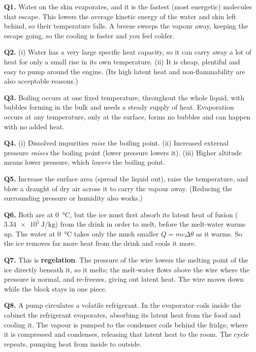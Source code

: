 \documentclass[10pt]{article}
\begin{document}
\textbf{Q1.} Water on the skin evaporates, and it is the fastest
(most energetic) molecules that escape. This lowers the average kinetic
energy of the water and skin left behind, so their temperature falls. A
breeze sweeps the vapour away, keeping the escape going, so the cooling
is faster and you feel colder.

\textbf{Q2.} (i) Water has a very large specific heat capacity, so it
can carry away a lot of heat for only a small rise in its own
temperature. (ii) It is cheap, plentiful and easy to pump around the
engine. (Its high latent heat and non-flammability are also acceptable
reasons.)

\textbf{Q3.} Boiling occurs at one fixed temperature, throughout the
whole liquid, with bubbles forming in the bulk and needs a steady
supply of heat. Evaporation occurs at any temperature, only at the
surface, forms no bubbles and can happen with no added heat.

\textbf{Q4.} (i) Dissolved impurities \emph{raise} the boiling point.
(ii) Increased external pressure \emph{raises} the boiling point (lower
pressure lowers it). (iii) Higher altitude means lower pressure, which
\emph{lowers} the boiling point.

\textbf{Q5.} Increase the surface area (spread the liquid out), raise
the temperature, and blow a draught of dry air across it to carry the
vapour away. (Reducing the surrounding pressure or humidity also works.)

\textbf{Q6.} Both are at \SI{0}{\degreeCelsius}, but the ice must first
absorb its latent heat of fusion ($\SI{3.34e5}{\joule\per\kilogram}$)
from the drink in order to melt, before the melt-water warms up. The
water at \SI{0}{\degreeCelsius} takes only the much smaller
$Q=mc\Delta\theta$ as it warms. So the ice removes far more heat from
the drink and cools it more.

\textbf{Q7.} This is \textbf{regelation}. The pressure of the wire
lowers the melting point of the ice directly beneath it, so it melts;
the melt-water flows above the wire where the pressure is normal, and
re-freezes, giving out latent heat. The wire moves down while the block
stays in one piece.

\textbf{Q8.} A pump circulates a volatile refrigerant. In the
evaporator coils inside the cabinet the refrigerant evaporates,
absorbing its latent heat from the food and cooling it. The vapour is
pumped to the condenser coils behind the fridge, where it is compressed
and condenses, releasing that latent heat to the room. The cycle
repeats, pumping heat from inside to outside.
\end{document}
